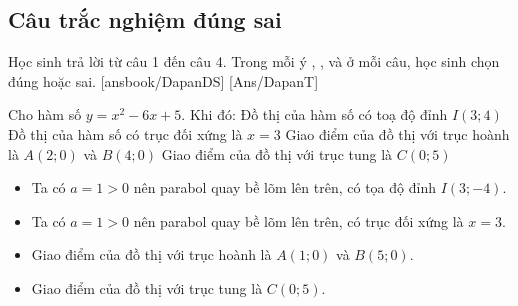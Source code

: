 
\subsection{Câu trắc nghiệm đúng sai}
Học sinh trả lời từ câu 1 đến câu 4.
Trong mỗi ý , ,  và  ở mỗi câu, học sinh chọn đúng hoặc sai.
\setcounter{ex}{0}
\LGexTF
{}[ansbook/DapanDS]
[Ans/DapanT]
\begin{ex}%
	Cho hàm số $y=x^2-6 x+5$. Khi đó:
	\choiceTF
	{Đồ thị của hàm số có toạ độ đỉnh $I(3 ; 4)$}
	{\True Đồ thị của hàm số có trục đối xứng là $x=3$}
	{Giao điểm của đồ thị với trục hoành là $A(2 ; 0)$ và $B(4 ; 0)$}
	{\True Giao điểm của đồ thị với trục tung là $C(0 ; 5)$}
	\loigiai
	{
		\begin{itemize}
			\item Ta có $a=1>0$ nên parabol quay bề lõm lên trên, có tọa độ đỉnh $I(3 ;-4)$.
			\item Ta có $a=1>0$ nên parabol quay bề lõm lên trên, có trục đối xứng là $x=3$.
			\item Giao điểm của đồ thị với trục hoành là $A(1 ; 0)$ và $B(5 ; 0)$.
			\item Giao điểm của đồ thị với trục tung là $C(0 ; 5)$.
		\end{itemize}
	}
\end{ex}

